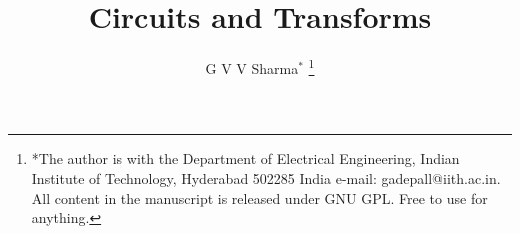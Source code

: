 \documentclass[journal,12pt,twocolumn]{IEEEtran}
\begin{document}
\let\StandardTheFigure\thefigure
\renewcommand{\thefigure}{\theproblem}



\def\putbox#1#2#3{\makebox[0in][l]{\makebox[#1][l]{}\raisebox{\baselineskip}[0in][0in]{\raisebox{#2}[0in][0in]{#3}}}}
\def\rightbox#1{\makebox[0in][r]{#1}}
\def\centbox#1{\makebox[0in]{#1}}
\def\topbox#1{\raisebox{-\baselineskip}[0in][0in]{#1}}
\def\midbox#1{\raisebox{-0.5\baselineskip}[0in][0in]{#1}}

\vspace{3cm}

\title{ 
Circuits and Transforms
}


%
%
%

\author{ G V V Sharma$^{*}$ %
\thanks{*The author is with the Department
of Electrical Engineering, Indian Institute of Technology, Hyderabad
502285 India e-mail:  gadepall@iith.ac.in.  All content in the manuscript is 
released under GNU GPL.  Free to use for anything. }%
}
% 
%
\end{document}
